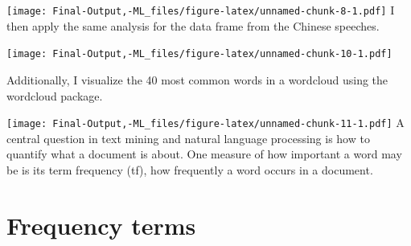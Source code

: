 \documentclass[
]{article}
\newenvironment{Shaded}{\begin{snugshade}}{\end{snugshade}}
\newcommand{\AttributeTok}[1]{\textcolor[rgb]{0.77,0.63,0.00}{#1}}
\newcommand{\CommentTok}[1]{\textcolor[rgb]{0.56,0.35,0.01}{\textit{#1}}}
\newcommand{\DecValTok}[1]{\textcolor[rgb]{0.00,0.00,0.81}{#1}}
\newcommand{\FunctionTok}[1]{\textcolor[rgb]{0.00,0.00,0.00}{#1}}
\newcommand{\NormalTok}[1]{#1}
\newcommand{\OtherTok}[1]{\textcolor[rgb]{0.56,0.35,0.01}{#1}}
\newcommand{\SpecialCharTok}[1]{\textcolor[rgb]{0.00,0.00,0.00}{#1}}
\newcommand{\StringTok}[1]{\textcolor[rgb]{0.31,0.60,0.02}{#1}}
\begin{document}
\texttt{[image: Final-Output,-ML\_files/figure-latex/unnamed-chunk-8-1.pdf]}
I then apply the same analysis for the data frame from the Chinese
speeches.

\texttt{[image: Final-Output,-ML\_files/figure-latex/unnamed-chunk-10-1.pdf]}

Additionally, I visualize the 40 most common words in a wordcloud using
the wordcloud package.

\begin{Shaded}
\end{Shaded}

\texttt{[image: Final-Output,-ML\_files/figure-latex/unnamed-chunk-11-1.pdf]}
A central question in text mining and natural language processing is how
to quantify what a document is about. One measure of how important a
word may be is its term frequency (tf), how frequently a word occurs in
a document.

\hypertarget{frequency-terms}{%
\section{Frequency terms}\label{frequency-terms}}
\end{document}
